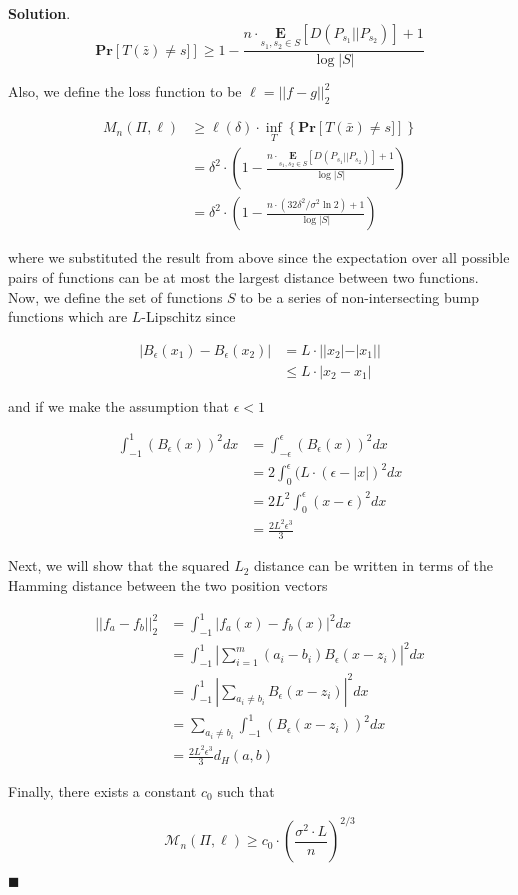 \documentclass[12pt]{article}
\theoremstyle{definition}
\newenvironment{s}{%
        \begin{trivlist} \item \textbf{Solution}. }{%
            \hspace*{\fill} $\blacksquare$\end{trivlist}}%
\begin{document}
{\begin{s}
\begin{equation*}
\mathbf{Pr}\left[T(\bar{z}) \neq s]\right] \geq 1 - \frac{n\cdot \underset{s_{1},s_{2}\in S}{\mathbf{E}}\left[D(P_{s_{1}}||P_{s_{2}})\right] + 1}{\log |S|}
\end{equation*}

Also, we define the loss function to be $\ell = ||f-g||_{2}^{2}$

\begin{align*}
M_{n}(\Pi, \ell) &\geq \ell(\delta)\cdot \underset{T}{\inf}\left\{\mathbf{Pr}\left[T(\bar{x}) \neq s]\right]\right\}\\
&= \delta^{2}\cdot\left(1 - \frac{n\cdot \underset{s_{1},s_{2}\in S}{\mathbf{E}}\left[D(P_{s_{1}}||P_{s_{2}})\right] + 1}{\log |S|}\right)\\
&= \delta^{2}\cdot\left(1 - \frac{n\cdot \left(32\delta^{2}/\sigma^{2}\ln 2\right) + 1}{\log |S|}\right)
\end{align*}

where we substituted the result from above since the expectation over all possible pairs of functions can be at most the largest distance between two functions. Now, we define the set of functions $S$ to be a series of non-intersecting bump functions which are $L$-Lipschitz since

\begin{align*}
|B_{\epsilon}(x_{1}) - B_{\epsilon}(x_{2})| &= L\cdot ||x_{2}|-|x_{1}||\\
&\leq L\cdot |x_{2}-x_{1}|
\end{align*}

and if we make the assumption that $\epsilon < 1$

\begin{align*}
\int_{-1}^{1}(B_{\epsilon}(x))^{2}dx &= \int_{-\epsilon}^{\epsilon}(B_{\epsilon}(x))^{2}dx\\
&= 2\int_{0}^{\epsilon} (L\cdot (\epsilon-|x|)^{2}dx\\
&= 2L^{2}\int_{0}^{\epsilon} (x-\epsilon)^{2}dx\\
&= \frac{2L^{2}\epsilon^{3}}{3}
\end{align*}

Next, we will show that the squared $L_{2}$ distance can be written in terms of the Hamming distance between the two position vectors

\begin{align*}
||f_{a}-f_{b}||_{2}^{2} &= \int_{-1}^{1} |f_{a}(x)-f_{b}(x)|^{2}dx\\
&= \int_{-1}^{1} |\sum_{i=1}^{m}(a_{i}-b_{i})B_{\epsilon}(x-z_{i})|^{2}dx\\
&= \int_{-1}^{1} |\sum_{a_{i}\neq b_{i}}B_{\epsilon}(x-z_{i})|^{2}dx\\
&= \sum_{a_{i}\neq b_{i}}\int_{-1}^{1} \left(B_{\epsilon}(x-z_{i})\right)^{2}dx\\
&= \frac{2L^{2}\epsilon^{3}}{3}d_{H}(a,b)
\end{align*}

Finally, there exists a constant $c_{0}$ such that

\begin{equation*}
\mathcal{M}_{n}(\Pi, \ell) \geq c_{0}\cdot \left(\frac{\sigma^{2}\cdot L}{n}\right)^{2/3}
\end{equation*}

\end{s}
\end{document}
